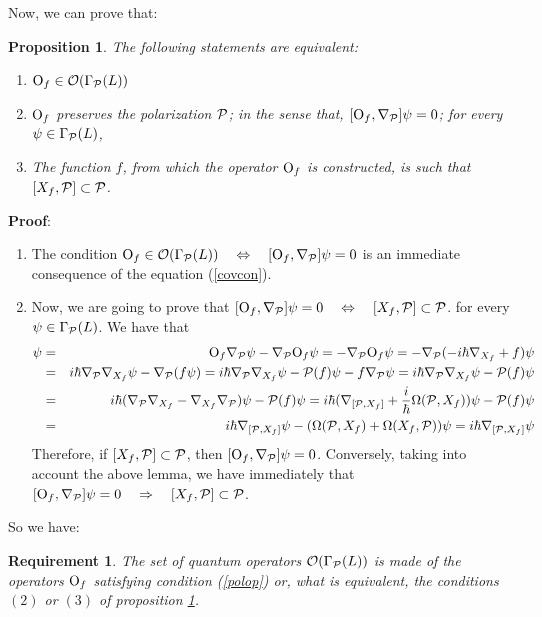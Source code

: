 \documentclass[12pt]{article}
\theoremstyle{plain}
\newtheorem{prop}{Proposition}
\newtheorem{require}{Requirement}
\def\beann{\begin{eqnarray*}}
\def\eeann{\end{eqnarray*}}
\def\qed{\ifvmode\removelastskip\fi
{\unskip\nobreak\hfil\penalty50\hbox{}\nobreak\hfil
\hbox{\vrule height1.2ex width1.2ex}\parfillskip=0pt
\finalhyphendemerits=0 \par\smallskip}}
\def\P{{\cal P}}
\def\Op{{\rm O}}
\begin{document}
Now, we can prove that:

\begin{prop}
The following statements are equivalent:
\begin{enumerate}
\item
$\Op_f \in {\cal O} (\Gamma_\P (L))$
\item
$\Op_f$ preserves the polarization $\P$; in the sense that,
$[\Op_f,\nabla_{\P}] \psi = 0$;
for every $\psi \in \Gamma_\P (L)$,
\item
The function $f$, from which the operator $\Op_f$ is constructed, is
such that
$[X_f,\P] \subset \P$.
\end{enumerate}
\label{cnspo}
\end{prop}
{\bf Proof}: 
\begin{enumerate}
\item
The condition
$\Op_f \in {\cal O} (\Gamma_\P (L)) \quad \Leftrightarrow \quad
[\Op_f,\nabla_{\P}] \psi = 0$
is an immediate consequence of the equation (\ref{covcon}).
\item
Now, we are going to prove that
$[\Op_f,\nabla_{\P}] \psi = 0
\quad \Leftrightarrow \quad
[X_f,\P] \subset \P$.
for every $\psi \in \Gamma_\P (L)$. We have that
\beann
[\Op_f,\nabla_{\P}] \psi
&=&
\Op_f\nabla_\P \psi - \nabla_\P \Op_f \psi =
-\nabla_\P \Op_f \psi =
-\nabla_\P (-i\hbar\nabla_{X_f}+f)\psi
\\ &=&
i\hbar\nabla_\P \nabla_{X_f}\psi - \nabla_\P (f\psi ) =
i\hbar\nabla_\P \nabla_{X_f}\psi - \P (f)\psi - f\nabla_\P \psi =
i\hbar\nabla_\P \nabla_{X_f}\psi - \P (f)\psi
\\ &=&
i\hbar(\nabla_\P \nabla_{X_f}-\nabla_{X_f}\nabla_{\P})\psi - \P (f)\psi
=
i\hbar(\nabla_{[\P ,X_f]}+\frac{i}{\hbar}\Omega (\P ,X_f))\psi - \P
(f)\psi
\\ &=&
i\hbar\nabla_{[\P ,X_f]}\psi - (\Omega (\P ,X_f) + \Omega (X_f,\P
))\psi  =
i\hbar\nabla_{[\P ,X_f]}\psi
\eeann
Therefore, if $[X_f,\P ] \subset \P$, then
$[\Op_f,\nabla_{\P}] \psi = 0$.
Conversely, taking into account the above lemma,
we have immediately that
$[\Op_f,\nabla_{\P}] \psi = 0
\quad \Rightarrow \quad
[X_f,\P] \subset \P$.
\end{enumerate}
\qed

So we have:

\begin{require}
The set of quantum operators
${\cal O} (\Gamma_\P (L))$
is made of the operators $\Op_f$ satisfying condition
(\ref{polop}) or, what is equivalent,
the conditions $(2)$ or $(3)$ of proposition \ref{cnspo}.
\label{quanop}
\end{require}
\end{document}
